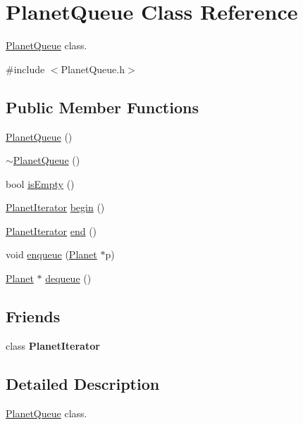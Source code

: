 \hypertarget{classPlanetQueue}{}\section{Planet\+Queue Class Reference}
\label{classPlanetQueue}


\hyperlink{classPlanetQueue}{Planet\+Queue} class.  




{\ttfamily \#include $<$Planet\+Queue.\+h$>$}

\subsection*{Public Member Functions}
\begin{DoxyCompactItemize}
\item 
\hyperlink{classPlanetQueue_aece3bd14bfbffdd61c5413bac9d92abf}{Planet\+Queue} ()
\item 
\hyperlink{classPlanetQueue_a401c7ec48201e2a9941ca9c952491f52}{$\sim$\+Planet\+Queue} ()
\item 
bool \hyperlink{classPlanetQueue_a50400f0c70785492f23f2703d9eac0cc}{is\+Empty} ()
\item 
\hyperlink{classPlanetIterator}{Planet\+Iterator} \hyperlink{classPlanetQueue_a00290482aee16d320ce429a03437751c}{begin} ()
\item 
\hyperlink{classPlanetIterator}{Planet\+Iterator} \hyperlink{classPlanetQueue_a587798b5e8ce4c647804379abbbcfd26}{end} ()
\item 
void \hyperlink{classPlanetQueue_a6876331ffc6b56a0e960e0be397babbb}{enqueue} (\hyperlink{classPlanet}{Planet} $\ast$p)
\item 
\hyperlink{classPlanet}{Planet} $\ast$ \hyperlink{classPlanetQueue_a9d64880eea8788b78ebb1b2f430f9f1f}{dequeue} ()
\end{DoxyCompactItemize}
\subsection*{Friends}
\begin{DoxyCompactItemize}
\item 
\mbox{\label{classPlanetQueue_a58d980e86656218a4f34476255718e53}} 
class {\bfseries Planet\+Iterator}
\end{DoxyCompactItemize}


\subsection{Detailed Description}
\hyperlink{classPlanetQueue}{Planet\+Queue} class. 

